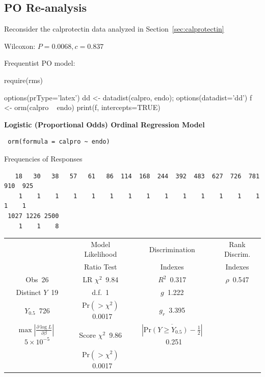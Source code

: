 \subsection{PO Re-analysis}
\bi
\item Reconsider the calprotectin data analyzed in Section~\ref{sec:calprotectin}
\item Wilcoxon: $P=0.0068, c=0.837$
\item Frequentist PO model:
{\smaller
\begin{Sinput}
require(rms)
\end{Sinput}
\begin{Sinput}
options(prType='latex')
dd <- datadist(calpro, endo); options(datadist='dd')
f <- orm(calpro ~ endo)
print(f, intercepts=TRUE)
\end{Sinput}

 \centerline{\textbf{Logistic (Proportional Odds) Ordinal Regression Model}}
 
 \begin{verbatim}
 orm(formula = calpro ~ endo)
 \end{verbatim}
 
 
 \centerline{Frequencies of Responses}
 
 \begin{verbatim}
   18   30   38   57   61   86  114  168  244  392  483  627  726  781  910  925 
    1    1    1    1    1    1    1    1    1    1    1    1    1    1    1    1 
 1027 1226 2500 
    1    1    8 
 \end{verbatim}
 
 {\selectfont \begin{center}\begin{tabular}{|c|c|c|c|}\hline
&Model Likelihood&Discrimination&Rank Discrim.\\
&Ratio Test& Indexes&Indexes\\\hline
Obs~\hfill 26&LR $\chi^{2}$~\hfill 9.84&$R^{2}$~\hfill 0.317&$\rho$~\hfill 0.547\\
Distinct $Y$~\hfill 19&d.f.~\hfill 1&$g$~\hfill 1.222&\\
$Y_{0.5}$~\hfill 726&Pr$(>\chi^{2})$~\hfill 0.0017&$g_{r}$~\hfill 3.395&\\
$\max|\frac{\partial\log L}{\partial \beta}|$~\hfill $5\!\times\!10^{-5}$&Score $\chi^{2}$~\hfill 9.86&$|\overline{\mathrm{Pr}(Y\geq Y_{0.5})-\frac{1}{2}}|$~\hfill 0.251&\\
&Pr$(>\chi^{2})$~\hfill 0.0017&&\\
\hline
\end{tabular}
\end{center}}
 
}

